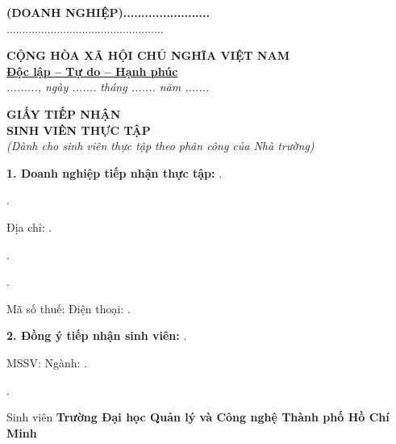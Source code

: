 \documentclass[12pt,a4paper]{article}
\newcommand{\densedotfill}{\leavevmode\cleaders\hbox{.\hspace{1.5pt}}\hfill\kern0pt}
\begin{document}
\begin{flushright}
\end{flushright}

\vspace{-0.5cm}

\noindent
\begin{minipage}[t]{0.45\textwidth}
\centering
\textbf{(DOANH NGHIỆP)........................}\\
..................................................
\end{minipage}
\hfill
\begin{minipage}[t]{0.55\textwidth}
\centering
\textbf{CỘNG HÒA XÃ HỘI CHỦ NGHĨA VIỆT NAM}\\
\textbf{\underline{Độc lập -- Tự do -- Hạnh phúc}}\\
\vspace{0.3cm}
\raggedleft
\textit{........., ngày ....... tháng ....... năm .......}
\end{minipage}

\vspace{1cm}

\begin{center}
\textbf{\Large GIẤY TIẾP NHẬN}\\
\textbf{\Large SINH VIÊN THỰC TẬP}\\
\vspace{0.2cm}
\textit{\small (Dành cho sinh viên thực tập theo phân công của Nhà trường)}
\end{center}

\vspace{0.8cm}

\noindent \textbf{1. Doanh nghiệp tiếp nhận thực tập:} \densedotfill

\noindent \densedotfill

\noindent Địa chỉ: \densedotfill

\noindent \densedotfill

\noindent \densedotfill

\noindent Mã số thuế: \makebox[5cm]{\densedotfill} Điện thoại: \densedotfill

\vspace{0.5cm}

\noindent \textbf{2. Đồng ý tiếp nhận sinh viên:} \densedotfill

\noindent MSSV: \makebox[5cm]{\densedotfill} Ngành: \densedotfill

\noindent \densedotfill

\noindent Sinh viên \textbf{Trường Đại học Quản lý và Công nghệ Thành phố Hồ Chí Minh}
\end{document}
